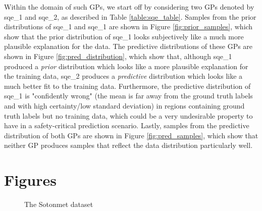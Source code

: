 \documentclass{article}
\begin{document}
Within the domain of such GPs, we start off by considering two GPs denoted by sqe\_1 and sqe\_2, as described in Table \ref{table:sqe_table}. Samples from the prior distributions of sqe\_1 and sqe\_1 are shown in Figure \ref{fig:prior_samples}, which show that the prior distribution of sqe\_1 looks subjectively like a much more plausible explanation for the data. The predictive distributions of these GPs are shown in Figure \ref{fig:pred_distribution}, which show that, although sqe\_1 produced a \emph{prior} distribution which looks like a more plausible explanation for the training data, sqe\_2 produces a \emph{predictive} distribution which looks like a much better fit to the training data. Furthermore, the predictive distribution of sqe\_1 is "confidently wrong" (the mean is far away from the ground truth labels and with high certainty/low standard deviation) in regions containing ground truth labels but no training data, which could be a very undesirable property to have in a safety-critical prediction scenario. Lastly, samples from the predictive distribution of both GPs are shown in Figure \ref{fig:pred_samples}, which show that neither GP produces samples that reflect the data distribution particularly well.

\appendix

\section{Figures}\label{appendix:figures}


\begin{figure}[pht]
    \centering
    \caption{The Sotonmet dataset}
    \label{fig:sotonmet}
\end{figure}
\end{document}
